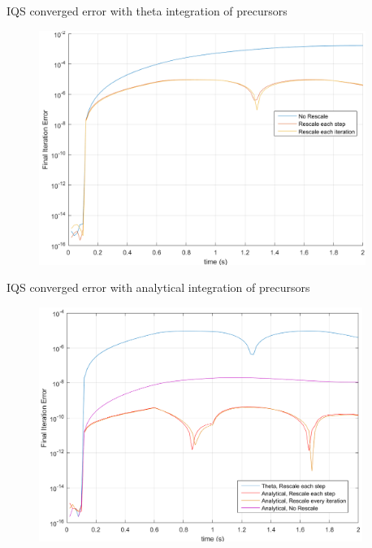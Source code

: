 \documentclass[8pt,xcolor=dvipnames]{beamer}
\begin{document}
\begin{frame}{IQS converged error with theta integration of precursors}

\begin{figure}
\includegraphics[width=\linewidth,height=3in,keepaspectratio]{figures/iter_error.png}
\end{figure}

\end{frame}

\begin{frame}{IQS converged error with analytical integration of precursors}

\begin{figure}
\includegraphics[width=\linewidth,height=3in,keepaspectratio]{figures/iter_error_an.png}
\end{figure}

\end{frame}
\end{document}
